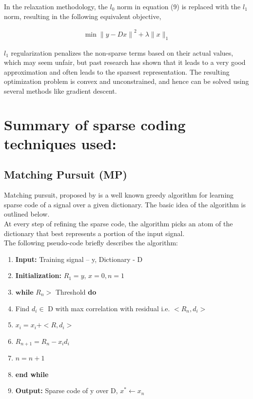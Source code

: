 \documentclass{article} %
\begin{document}
In the relaxation methodology, the $l_0$ norm in equation (9) is replaced with the $l_1$ norm, resulting in the following equivalent objective,

\begin{align}
\min{\|y-Dx\|}^2 +\lambda \|x\|_1
\end{align}

$l_1$ regularization penalizes the non-sparse terms based on their actual values, which may seem unfair, but past research \citep{yang2010fast} has shown that it leads to a very good approximation and often leads to the sparsest representation.  The resulting optimization problem is convex and unconstrained, and hence can be solved using several methods like gradient descent.



\section{Summary of sparse coding techniques used:}

\subsection{Matching Pursuit (MP)}
  Matching pursuit, proposed by \cite{mallat1993matching} is a well known greedy algorithm for learning sparse code of a signal over a given dictionary. The basic idea of the algorithm is outlined below.\\ 
At every step of refining the sparse code, the algorithm picks an atom of the dictionary that best represents a portion of the input signal. \\

The following pseudo-code briefly describes the algorithm:\\


\begin{enumerate}
\item \textbf{Input:} Training signal – y, Dictionary - D
\item \textbf{Initialization:} $R_1=y$, $x=0, n=1$
\item $\textbf{while}$ $R_n >$ Threshold \textbf{do}
\item \hspace*{.4cm} Find $d_i \in $ D with max correlation with residual i.e. $<R_n,d_i>$
\item \hspace*{.4cm} $x_i=x_i+<R,d_i>$
\item \hspace*{.4cm} $R_{n+1}=R_n-x_id_i$
\item \hspace*{.4cm} $n=n+1$
\item \textbf{end while}
\item \textbf{Output: }Sparse code of y over D, $x^* \leftarrow x_n$
\end{enumerate}
\end{document}
